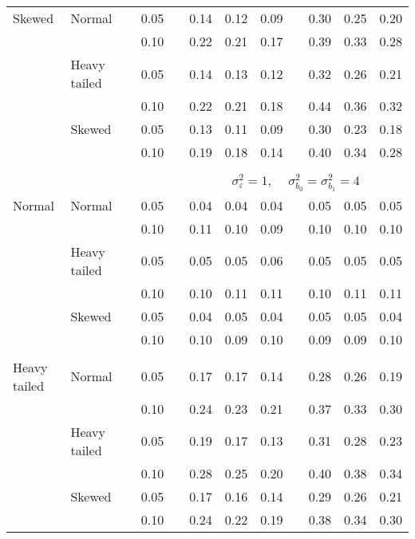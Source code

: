 \begin{table}[ht]
\begin{scriptsize}
\begin{tabular}{ll p{.1cm} c p{.1cm} rrr p{.1cm} rrr}
Skewed       & Normal       && 0.05 &&  0.14 & 0.12 & 0.09 && 0.30 & 0.25 & 0.20 \\ 
             &              && 0.10 &&  0.22 & 0.21 & 0.17 && 0.39 & 0.33 & 0.28 \\ 
             & Heavy tailed && 0.05 &&  0.14 & 0.13 & 0.12 && 0.32 & 0.26 & 0.21 \\ 
             &              && 0.10 &&  0.22 & 0.21 & 0.18 && 0.44 & 0.36 & 0.32 \\ 
             & Skewed       && 0.05 &&  0.13 & 0.11 & 0.09 && 0.30 & 0.23 & 0.18 \\ 
             &              && 0.10 &&  0.19 & 0.18 & 0.14 && 0.40 & 0.34 & 0.28 \\ 


&&&&&&&&&&&\\
& && && \multicolumn{7}{c}{$\sigma_{\varepsilon}^2 = 1$, \ \ $\sigma_{b_0}^2 = \sigma_{b_1}^2 = 4$} \\ \cline{6-12}
\rowcolor{gray!20}Normal       & Normal       && 0.05 &&  0.04 & 0.04 & 0.04 && 0.05 & 0.05 & 0.05 \\ 
\rowcolor{gray!20}             &              && 0.10 &&  0.11 & 0.10 & 0.09 && 0.10 & 0.10 & 0.10 \\ 
\rowcolor{gray!20}             & Heavy tailed && 0.05 &&  0.05 & 0.05 & 0.06 && 0.05 & 0.05 & 0.05 \\ 
\rowcolor{gray!20}             &              && 0.10 &&  0.10 & 0.11 & 0.11 && 0.10 & 0.11 & 0.11 \\ 
\rowcolor{gray!20}             & Skewed       && 0.05 &&  0.04 & 0.05 & 0.04 && 0.05 & 0.05 & 0.04 \\ 
\rowcolor{gray!20}             &              && 0.10 &&  0.10 & 0.09 & 0.10 && 0.09 & 0.09 & 0.10 \\
             &&&&&&&&&&&\\ 
Heavy tailed & Normal       && 0.05 &&  0.17 & 0.17 & 0.14 && 0.28 & 0.26 & 0.19 \\ 
             &              && 0.10 &&  0.24 & 0.23 & 0.21 && 0.37 & 0.33 & 0.30 \\ 
             & Heavy tailed && 0.05 &&  0.19 & 0.17 & 0.13 && 0.31 & 0.28 & 0.23 \\ 
             &              && 0.10 &&  0.28 & 0.25 & 0.20 && 0.40 & 0.38 & 0.34 \\ 
             & Skewed       && 0.05 &&  0.17 & 0.16 & 0.14 && 0.29 & 0.26 & 0.21 \\ 
             &              && 0.10 &&  0.24 & 0.22 & 0.19 && 0.38 & 0.34 & 0.30 \\ 

\end{tabular}
\end{scriptsize}
\end{table}
